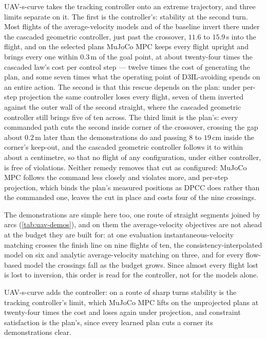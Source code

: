 UAV-s-curve takes the tracking controller onto an extreme trajectory, and three limits separate on it. The
first is the controller's: stability at the second turn. Most flights of the average-velocity models and of
the baseline invert there under the cascaded geometric controller, just past the crossover, $11.6$ to
$15.9$\,s into the flight, and on the selected plans MuJoCo MPC keeps every flight upright and brings every one
within $0.3$\,m of the goal point, at about twenty-four times the cascaded law's cost per control step ---
twelve times the cost of generating the plan, and some seven times what the operating point of D3IL-avoiding
spends on an entire action. The second is that this rescue depends on the plan: under per-step projection the
same controller loses every flight, seven of them inverted against the outer wall of the second straight,
where the cascaded geometric controller still brings five of ten across. The third limit is the plan's: every
commanded path cuts the second inside corner of the crossover, crossing the gap about $0.2$\,m later than the
demonstrations do and passing $8$ to $19$\,cm inside the corner's keep-out, and the cascaded geometric
controller follows it to within about a centimetre, so that no flight of any configuration, under either
controller, is free of violations. Neither remedy removes that cut as configured: MuJoCo MPC follows the
command less closely and violates more, and per-step projection, which binds the plan's measured positions as
\ac{DPCC} does rather than the commanded one, leaves the cut in place and costs four of the nine crossings.

The demonstrations are simple here too, one route of straight segments joined by arcs
(\autoref{tab:uav-demos}), and on them the average-velocity objectives are not ahead at the budget they are
built for: at one evaluation instantaneous-velocity matching crosses the finish line on nine flights of ten,
the consistency-interpolated model on six and analytic average-velocity matching on three, and for every
flow-based model the crossings fall as the budget grows. Since almost every flight lost is lost to
inversion, this order is read for the controller, not for the models alone.

UAV-s-curve adds the controller: on
a route of sharp turns stability is the tracking controller's limit, which MuJoCo MPC lifts on the unprojected
plans at twenty-four times the cost and loses again under projection, and constraint satisfaction is the
plan's, since every learned plan cuts a corner its demonstrations clear.
